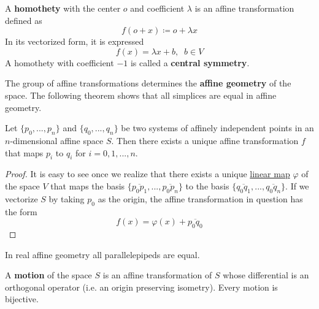   \begin{definition}[Homothety]
    \label{def:homothety}
    A \textbf{homothety} with the center $o$ and coefficient $\lambda$ is an affine transformation defined as
    \begin{equation}
      f( o + x ) \coloneqq o + \lambda x
    \end{equation}
    In its vectorized form, it is expressed
    \begin{equation}
      f(x) = \lambda x + b, \;\; b \in V
    \end{equation}
    A homothety with coefficient $-1$ is called a \textbf{central symmetry}. 
  \end{definition}

  The group of affine transformations determines the \textbf{affine geometry} of the space. The following theorem shows that all simplices are equal in affine geometry. 

  \begin{theorem}
    \label{thm:affine-maps-between-independent-point-systems}
    Let $\{p_0, ..., p_n\}$ and $\{q_0, ..., q_n\}$ be two systems of affinely independent points in an $n$-dimensional affine space $S$. Then there exists a unique affine transformation $f$ that maps $p_i$ to $q_i$ for $i = 0, 1, ..., n$. 
  \end{theorem}
  \begin{proof}
    It is easy to see once we realize that there exists a unique \hyperref[thm:linear-map]{linear map} $\varphi$ of the space $V$ that maps the basis $\{\overline{p_0 p_1}, ..., \overline{p_0 p_n}\}$ to the basis $\{\overline{q_0 q_1}, ..., \overline{q_0 q_n}\}$. If we vectorize $S$ by taking $p_0$ as the origin, the affine transformation in question has the form 
    \begin{equation}
      f(x) = \varphi(x) + \overline{p_0 q_0}
    \end{equation}
  \end{proof}

  \begin{corollary}
    \label{thm:all-parallelepipeds-are-affinely-equivalent}
    In real affine geometry all parallelepipeds are equal. 
  \end{corollary}

  \begin{definition}[Motion]
    \label{def:motion}
    A \textbf{motion} of the space $S$ is an affine transformation of $S$ whose differential is an orthogonal operator (i.e. an origin preserving isometry). Every motion is bijective. 
  \end{definition}

